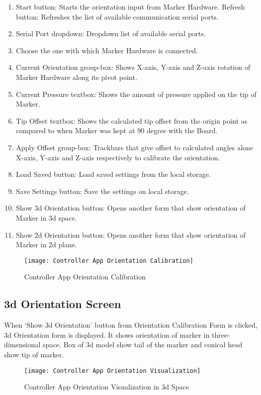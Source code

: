 \begin{enumerate}

\item Start button: Starts the orientation input from Marker Hardware.
Refresh button: Refreshes the list of available communication serial ports.
\item Serial Port dropdown: Dropdown list of available serial ports. \item Choose the one with which Marker Hardware is connected.
\item Current Orientation group-box: Shows X-axis, Y-axis and Z-axis rotation of Marker Hardware along its pivot point.
\item Current Pressure textbox: Shows the amount of pressure applied on the tip of Marker.
\item Tip Offset textbox: Shows the calculated tip offset from the origin point as compared to when Marker was kept at 90 degree with the Board.
\item Apply Offset group-box: Trackbars that give offset to calculated angles alone X-axis, Y-axis and Z-axis respectively to calibrate the orientation.
\item Load Saved button: Load saved settings from the local storage.
\item Save Settings button: Save the settings on local storage.
\item Show 3d Orientation button: Opens another form that show orientation of Marker in 3d space.
\item Show 2d Orientation button: Opens another form that show orientation of Marker in 2d plane.

\end{enumerate}

\begin{figure}[h]
  \centering
  \texttt{[image: Controller App Orientation Calibration]}
  \caption{Controller App Orientation Calibration}
\end{figure}

\subsection{3d Orientation Screen}
When ‘Show 3d Orientation’ button from Orientation Calibration Form is clicked, 3d Orientation form is displayed. It shows orientation of marker in three-dimensional space. Box of 3d model show tail of the marker and conical head show tip of marker.

\newpage
\begin{figure}[h]
  \centering
  \texttt{[image: Controller App Orientation Visualization]}
  \caption{Controller App Orientation Visualization in 3d Space}
\end{figure}

